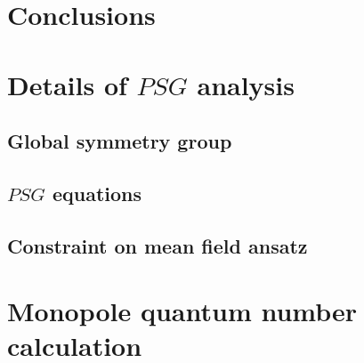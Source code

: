 \documentclass[%
 reprint,
 amsmath,amssymb,
 aps,
 pra, %
]{revtex4-1}
\begin{document}
\section{Conclusions}


\appendix

\section{Details of $PSG$ analysis}
\subsection{Global symmetry group}
\subsection{$PSG$ equations}
\subsection{Constraint on mean field ansatz}

\section{Monopole quantum number calculation}



\end{document}
